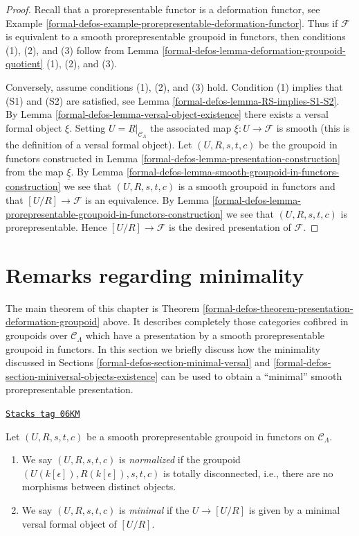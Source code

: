\begin{proof}
Recall that a prorepresentable functor is a deformation functor, see
Example \ref{formal-defos-example-prorepresentable-deformation-functor}. Thus
if $\mathcal{F}$ is equivalent to a smooth prorepresentable groupoid in
functors, then conditions (1), (2), and (3) follow from
Lemma \ref{formal-defos-lemma-deformation-groupoid-quotient} (1), (2), and (3).

\medskip\noindent
Conversely, assume conditions (1), (2), and (3) hold. Condition (1)
implies that (S1) and (S2) are satisfied, see
Lemma \ref{formal-defos-lemma-RS-implies-S1-S2}.
By
Lemma \ref{formal-defos-lemma-versal-object-existence}
there exists a versal formal object $\xi$. Setting
$U = \underline{R}|_{\mathcal{C}_\Lambda}$ the
associated map $\underline{\xi} : U \to \mathcal{F}$ is smooth (this is
the definition of a versal formal object).
Let $(U, R, s, t, c)$ be the groupoid in functors constructed in
Lemma \ref{formal-defos-lemma-presentation-construction}
from the map $\underline{\xi}$. By
Lemma \ref{formal-defos-lemma-smooth-groupoid-in-functors-construction}
we see that $(U, R, s, t, c)$ is a smooth groupoid in functors and that
$[U/R] \to \mathcal{F}$ is an equivalence. By
Lemma \ref{formal-defos-lemma-prorepresentable-groupoid-in-functors-construction}
we see that $(U, R, s, t, c)$ is prorepresentable.
Hence $[U/R] \to \mathcal{F}$ is the desired presentation of $\mathcal{F}$.
\end{proof}

\section{Remarks regarding minimality}
\label{formal-defos-section-minimality}
The main theorem of this chapter is
Theorem \ref{formal-defos-theorem-presentation-deformation-groupoid}
above. It describes completely those categories cofibred in groupoids
over $\mathcal{C}_\Lambda$ which have a presentation by a
smooth prorepresentable groupoid in functors. In this section we briefly
discuss how the minimality discussed in
Sections \ref{formal-defos-section-minimal-versal} and
\ref{formal-defos-section-miniversal-objects-existence}
can be used to obtain a ``minimal'' smooth prorepresentable presentation.

\begin{definition}
\label{formal-defos-definition-minimal-groupoid-in-functors}
\href{https://stacks.math.columbia.edu/tag/06KM}{\texttt{Stacks tag 06KM}}

Let $(U, R, s, t, c)$ be a smooth prorepresentable groupoid in functors
on $\mathcal{C}_\Lambda$.
\begin{enumerate}
\item We say $(U, R, s, t, c)$ is {\it normalized} if the groupoid
$(U(k[\epsilon]), R(k[\epsilon]), s, t, c)$ is totally disconnected,
i.e., there are no morphisms between distinct objects.
\item We say $(U, R, s, t, c)$ is {\it minimal} if the $U \to [U/R]$
is given by a minimal versal formal object of $[U/R]$.
\end{enumerate}
\end{definition}

